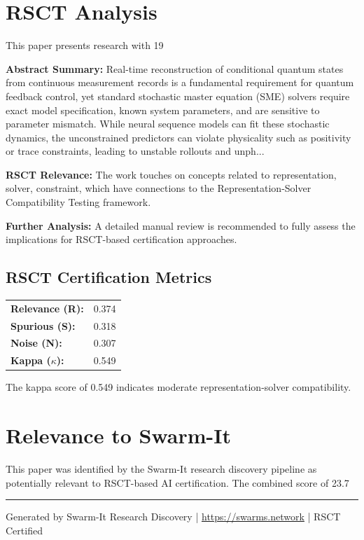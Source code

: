 \documentclass[11pt,a4paper]{article}
\begin{document}
\section{RSCT Analysis}
This paper presents research with 19%

\textbf{Abstract Summary:} Real-time reconstruction of conditional quantum states from continuous measurement records is a fundamental requirement for quantum feedback control, yet standard stochastic master equation (SME) solvers require exact model specification, known system parameters, and are sensitive to parameter mismatch. While neural sequence models can fit these stochastic dynamics, the unconstrained predictors can violate physicality such as positivity or trace constraints, leading to unstable rollouts and unph...

\textbf{RSCT Relevance:} The work touches on concepts related to representation, solver, constraint, which have connections to the Representation-Solver Compatibility Testing framework.

\textbf{Further Analysis:} A detailed manual review is recommended to fully assess the implications for RSCT-based certification approaches.


\subsection*{RSCT Certification Metrics}
\begin{tabular}{ll}
\textbf{Relevance (R):} & 0.374 \\
\textbf{Spurious (S):} & 0.318 \\
\textbf{Noise (N):} & 0.307 \\
\textbf{Kappa ($\kappa$):} & 0.549 \\
\end{tabular}

The kappa score of 0.549 indicates moderate representation-solver compatibility.


\section{Relevance to Swarm-It}
This paper was identified by the Swarm-It research discovery pipeline as potentially relevant to RSCT-based AI certification. The combined score of 23.7%

\vspace{1em}
\hrule
\vspace{0.5em}
\small{Generated by Swarm-It Research Discovery | \url{https://swarms.network} | RSCT Certified}
\end{document}
